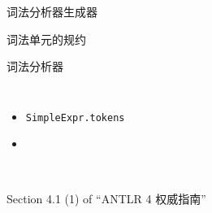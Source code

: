 
\begin{frame}{}
  \begin{center}
    词法分析器生成器
  \end{center}
\end{frame}

\begin{frame}{}
  \begin{center}
     词法单元的规约

    \vspace{0.50cm}
    \texttt{}

    \vspace{1.00cm}
     词法分析器

    \begin{columns}
        \begin{itemize}
          \setlength{\itemsep}{8pt}
          \item \texttt{SimpleExpr.tokens}
          \item \texttt{}
        \end{itemize}
    \end{columns}


  \end{center}
\end{frame}

\begin{frame}{}
\end{frame}

\begin{frame}{}
  \begin{center}
     \\[10pt]

    Section 4.1 (1) of ``ANTLR 4 权威指南''
  \end{center}
\end{frame}

